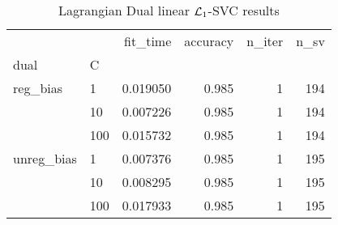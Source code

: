 \begin{table}[H]
\centering
\caption{Lagrangian Dual linear $\protect \mathcal{L}_1$-SVC results}
\label{linear_lagrangian_dual_l1_svc_cv_results}
\begin{tabular}{llrrrr}
\toprule
           &     &  fit\_time &  accuracy &  n\_iter &  n\_sv \\
dual & C &           &           &         &       \\
\midrule
reg\_bias & 1   &  0.019050 &     0.985 &       1 &   194 \\
           & 10  &  0.007226 &     0.985 &       1 &   194 \\
           & 100 &  0.015732 &     0.985 &       1 &   194 \\
unreg\_bias & 1   &  0.007376 &     0.985 &       1 &   195 \\
           & 10  &  0.008295 &     0.985 &       1 &   195 \\
           & 100 &  0.017933 &     0.985 &       1 &   195 \\
\bottomrule
\end{tabular}
\end{table}
